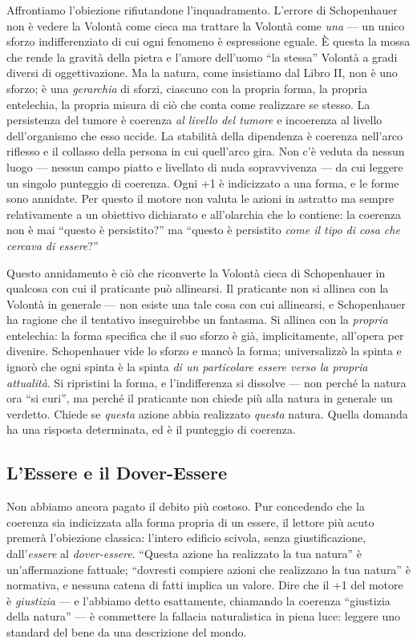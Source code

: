 Affrontiamo l'obiezione rifiutandone l'inquadramento. L'errore di Schopenhauer
non \`e vedere la Volont\`a come cieca ma trattare la Volont\`a come \emph{una}
--- un unico sforzo indifferenziato di cui ogni fenomeno \`e espressione
eguale. \`E questa la mossa che rende la gravit\`a della pietra e l'amore
dell'uomo ``la stessa'' Volont\`a a gradi diversi di oggettivazione. Ma la
natura, come insistiamo dal Libro II, non \`e uno sforzo; \`e una
\emph{gerarchia} di sforzi, ciascuno con la propria forma, la propria
entelechia, la propria misura di ci\`o che conta come realizzare se stesso. La
persistenza del tumore \`e coerenza \emph{al livello del tumore} e incoerenza al
livello dell'organismo che esso uccide. La stabilit\`a della dipendenza \`e
coerenza nell'arco riflesso e il collasso della persona in cui quell'arco
gira. Non c'\`e veduta da nessun luogo --- nessun campo piatto e livellato di
nuda sopravvivenza --- da cui leggere un singolo punteggio di coerenza. Ogni +1
\`e indicizzato a una forma, e le forme sono annidate. Per questo il motore non
valuta le azioni in astratto ma sempre relativamente a un obiettivo dichiarato e
all'olarchia che lo contiene: la coerenza non \`e mai ``questo \`e persistito?''
ma ``questo \`e persistito \emph{come il tipo di cosa che cercava di essere}?''

Questo annidamento \`e ci\`o che riconverte la Volont\`a cieca di Schopenhauer
in qualcosa con cui il praticante pu\`o allinearsi. Il praticante non si allinea
con la Volont\`a in generale --- non esiste una tale cosa con cui allinearsi, e
Schopenhauer ha ragione che il tentativo inseguirebbe un fantasma. Si allinea con
la \emph{propria} entelechia: la forma specifica che il suo sforzo \`e gi\`a,
implicitamente, all'opera per divenire. Schopenhauer vide lo sforzo e manc\`o la
forma; universalizz\`o la spinta e ignor\`o che ogni spinta \`e la spinta \emph{di
un particolare essere verso la propria attualit\`a}. Si ripristini la forma, e
l'indifferenza si dissolve --- non perch\'e la natura ora ``si curi'', ma perch\'e
il praticante non chiede pi\`u alla natura in generale un verdetto. Chiede se
\emph{questa} azione abbia realizzato \emph{questa} natura. Quella domanda ha una
risposta determinata, ed \`e il punteggio di coerenza.

\subsection{L'Essere e il Dover-Essere}

Non abbiamo ancora pagato il debito pi\`u costoso. Pur concedendo che la coerenza
sia indicizzata alla forma propria di un essere, il lettore pi\`u acuto premer\`a
l'obiezione classica: l'intero edificio scivola, senza giustificazione,
dall'\emph{essere} al \emph{dover-essere}. ``Questa azione ha realizzato la tua
natura'' \`e un'affermazione fattuale; ``dovresti compiere azioni che realizzano
la tua natura'' \`e normativa, e nessuna catena di fatti implica un valore. Dire
che il +1 del motore \`e \emph{giustizia} --- e l'abbiamo detto esattamente,
chiamando la coerenza ``giustizia della natura'' --- \`e commettere la fallacia
naturalistica in piena luce: leggere uno standard del bene da una descrizione del
mondo.

